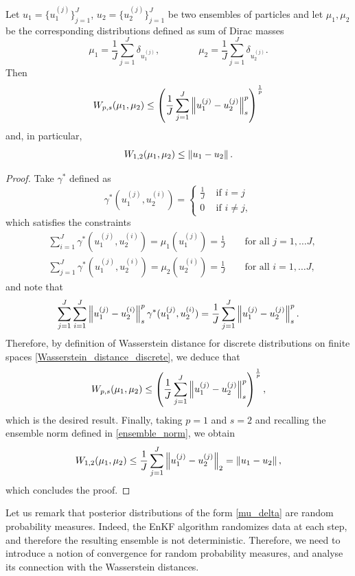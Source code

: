 \documentclass[10pt]{article}
\begin{document}
\begin{lemma}
\label{Wasserstein_ensemble_norm}
Let $u_1 = \{ u_1^{(j)} \}_{j=1}^J$, $u_2 = \{ u_2^{(j)} \}_{j=1}^J$ be two ensembles of particles and let $\mu_1, \mu_2$ be the corresponding distributions defined as sum of Dirac masses
\begin{equation*}
\mu_1 = \frac{1}{J} \sum_{j=1}^J \delta_{u_1^{(j)}}, \qquad \qquad \mu_2 = \frac{1}{J} \sum_{j=1}^J \delta_{u_2^{(j)}}.
\end{equation*}
Then
\[ W_{p,s}(\mu_1, \mu_2) \le \left ( \frac{1}{J} \sum_{j=1}^J \left\|u_1^{(j)} - u_2^{(j)}\right\|_s^p \right )^{\frac{1}{p}} \]
and, in particular,
\[ W_{1,2}(\mu_1, \mu_2) \le \left\|u_1 - u_2\right\|. \]
\end{lemma}
\begin{proof}
Take $\gamma^*$ defined as
\begin{equation*}
\gamma^*(u_1^{(j)}, u_2^{(i)}) =
\begin{cases}
\frac{1}{J} & \text{ if } i = j \\
0 & \text{ if } i \neq j,
\end{cases}
\end{equation*}
which satisfies the constraints
\begin{align*}
& \sum_{i=1}^{J} \gamma^*(u_1^{(j)}, u_2^{(i)}) = \mu_1(u_1^{(j)}) = \frac{1}{J} \qquad \text{for all } j = 1, \dots J, \\
& \sum_{j=1}^{J} \gamma^*(u_1^{(j)}, u_2^{(i)}) = \mu_2(u_2^{(i)}) = \frac{1}{J} \qquad \text{for all } i = 1, \dots J,
\end{align*}
and note that
\begin{equation*}
\sum_{j=1}^{J} \sum_{i=1}^{J} \left\|u_1^{(j)} - u_2^{(i)}\right\|_s^p \gamma^*(u_1^{(j)}, u_2^{(i)}) = \frac{1}{J} \sum_{j=1}^{J} \left\|u_1^{(j)} - u_2^{(j)}\right\|_s^p.
\end{equation*}
Therefore, by definition of Wasserstein distance for discrete distributions on finite spaces \eqref{Wasserstein_distance_discrete}, we deduce that
\[ W_{p,s}(\mu_1, \mu_2) \le \left ( \frac{1}{J} \sum_{j=1}^J \left\|u_1^{(j)} - u_2^{(j)}\right\|_s^p \right )^{\frac{1}{p}}, \]
which is the desired result. Finally, taking $p = 1$ and $s = 2$ and recalling the ensemble norm defined in \eqref{ensemble_norm}, we obtain
\[ W_{1,2}(\mu_1, \mu_2) \le \frac{1}{J} \sum_{j=1}^J \left\|u_1^{(j)} - u_2^{(j)}\right\|_2 = \left\|u_1 - u_2\right\|, \]
which concludes the proof.
\end{proof}

Let us remark that posterior distributions of the form \eqref{mu_delta} are random probability measures. Indeed, the EnKF algorithm randomizes data at each step, and therefore the resulting ensemble is not deterministic. Therefore, we need to introduce a notion of convergence for random probability measures, and analyse its connection with the Wasserstein distances.
\end{document}
